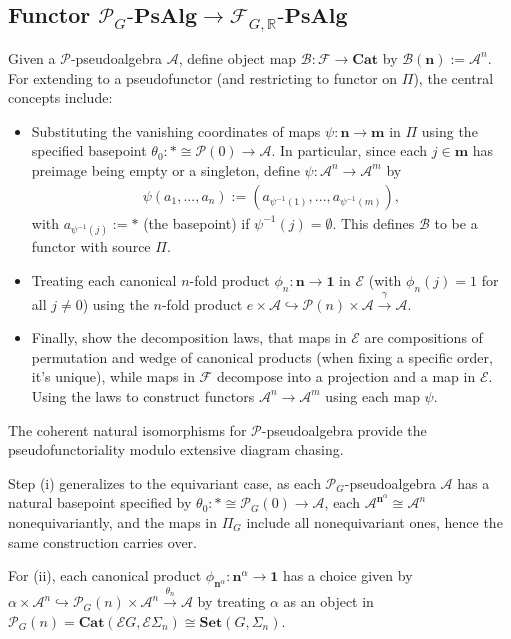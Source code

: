 \documentclass[openany, amssymb, psamsfonts]{amsart}
\theoremstyle{definition}
\numberwithin{equation}{section}
\newcommand{\Cat}{\mathbf{Cat}} %
\newcommand{\PsAlg}{\mathbf{PsAlg}} %
\newcommand{\Sets}{\mathbf{Set}} %
\newcommand{\F}{\mathscr{F}} %
\newcommand{\cP}{\mathscr{P}} %
\newcommand{\A}{\mathscr{A}}
\newcommand{\B}{\mathscr{B}}
\newcommand{\RR}{\mathbb{R}} %
\begin{document}
\subsection{Functor $\cP_G\text{-}\PsAlg\rightarrow\F_{G,\RR}\text{-}\PsAlg$}
Given a $\cP$-pseudoalgebra $\A$, define object map $\B:\F\rightarrow\Cat$ by $\B(\mathbf{n}):=\A^n$. For extending to a pseudofunctor (and restricting to functor on $\Pi$), the central concepts include: 
\begin{itemize}
    \item[(i)] Substituting the vanishing coordinates of maps $\psi:\mathbf{n}\rightarrow\mathbf{m}$ in $\Pi$ using the specified basepoint $\theta_0:*\cong \cP(0)\rightarrow\A$. In particular, since each $j\in\mathbf{m}$ has preimage being empty or a singleton, define $\psi:\A^n\rightarrow\A^m$ by 
    \begin{align*}
        \psi(a_1,...,a_n):= (a_{\psi^{-1}(1)},...,a_{\psi^{-1}(m)}),
    \end{align*}
    with $a_{\psi^{-1}(j)}:=*$ (the basepoint) if $\psi^{-1}(j)=\emptyset$. This defines $\B$ to be a functor with source $\Pi$.
    \item[(ii)] Treating each canonical $n$-fold product $\phi_n:\mathbf{n}\rightarrow\mathbf{1}$ in $\mathscr{E}$ (with $\phi_n(j)=1$ for all $j\neq 0$) using the $n$-fold product $e\times\A\hookrightarrow \cP(n)\times \A\xrightarrow{\gamma}\A$.
    \item[(iii)] Finally, show the decomposition laws, that maps in $\mathscr{E}$ are compositions of permutation and wedge of canonical products (when fixing a specific order, it's unique), while maps in $\F$ decompose into a projection and a map in $\mathscr{E}$. Using the laws to construct functors $\A^n\rightarrow\A^m$ using each map $\psi$.
\end{itemize}

The coherent natural isomorphisms for $\cP$-pseudoalgebra provide the pseudofunctoriality modulo extensive diagram chasing.

\vspace{1pt}

Step (i) generalizes  to the equivariant case, as each $\cP_G$-pseudoalgebra $\A$ has a natural basepoint specified by $\theta_0:*\cong \cP_G(0)\rightarrow\A$, each $\A^{\mathbf{n}^\alpha}\cong \A^n$ nonequivariantly, and the maps in $\Pi_G$ include all nonequivariant ones, hence the same construction carries over. 

For (ii), each canonical product $\phi_{\mathbf{n}^\alpha}:\mathbf{n}^\alpha\rightarrow\mathbf{1}$ has a choice given by $\alpha\times \A^n\hookrightarrow \cP_G(n)\times \A^n\xrightarrow{\theta_n}\A$ by treating $\alpha$ as an object in $\cP_G(n)=\Cat(\mathscr{E}G,\mathscr{E}\Sigma_n)\cong \Sets(G,\Sigma_n)$.
\end{document}
